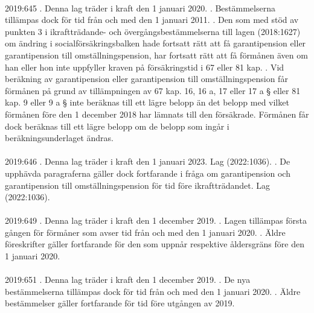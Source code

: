 \documentclass[a4paper,notitlepage,openany,10pt]{book}
\begin{document}
\paragraph*{}
2019:645
. Denna lag träder i kraft den 1 januari 2020.
. Bestämmelserna tillämpas dock för tid från och med den 1 januari 2011.
. Den som med stöd av punkten 3 i ikraftträdande- och övergångsbestämmelserna till lagen (2018:1627) om ändring i socialförsäkringsbalken hade fortsatt rätt att få garantipension eller garantipension till omställningspension, har fortsatt rätt att få förmånen även om han eller hon inte uppfyller kraven på försäkringstid i 67 eller 81 kap.
. Vid beräkning av garantipension eller garantipension till omställningspension får förmånen på grund av tillämpningen av 67 kap. 16, 16 a, 17 eller 17 a § eller 81 kap. 9 eller 9 a § inte beräknas till ett lägre belopp än det belopp med vilket förmånen före den 1 december 2018 har lämnats till den försäkrade. Förmånen får dock beräknas till ett lägre belopp om de belopp som ingår i beräkningsunderlaget ändras.
\paragraph*{}
2019:646
. Denna lag träder i kraft den 1 januari 2023.
Lag (2022:1036).
. De upphävda paragraferna gäller dock fortfarande i fråga om garantipension och garantipension till omställningspension för tid före ikraftträdandet.
Lag (2022:1036).
\paragraph*{}
2019:649
. Denna lag träder i kraft den 1 december 2019.
. Lagen tillämpas första gången för förmåner som avser tid från och med den 1 januari 2020.
. Äldre föreskrifter gäller fortfarande för den som uppnår respektive åldersgräns före den 1 januari 2020.
\paragraph*{}
2019:651
. Denna lag träder i kraft den 1 december 2019.
. De nya bestämmelserna tillämpas dock för tid från och med den 1 januari 2020.
. Äldre bestämmelser gäller fortfarande för tid före utgången av 2019.
\end{document}
